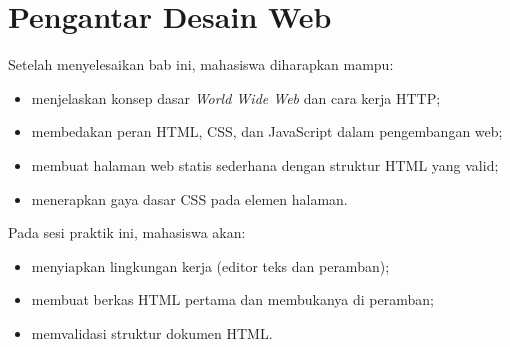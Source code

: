 %

\chapter{Pengantar Desain Web}
\label{chap:pengantar}

\begin{capaian}
Setelah menyelesaikan bab ini, mahasiswa diharapkan mampu:
\begin{itemize}
  \item menjelaskan konsep dasar \emph{World Wide Web} dan cara kerja HTTP;
  \item membedakan peran HTML, CSS, dan JavaScript dalam pengembangan web;
  \item membuat halaman web statis sederhana dengan struktur HTML yang valid;
  \item menerapkan gaya dasar CSS pada elemen halaman.
\end{itemize}
\end{capaian}

\begin{tujuanpraktik}
Pada sesi praktik ini, mahasiswa akan:
\begin{itemize}
  \item menyiapkan lingkungan kerja (editor teks dan peramban);
  \item membuat berkas HTML pertama dan membukanya di peramban;
  \item memvalidasi struktur dokumen HTML.
\end{itemize}
\end{tujuanpraktik}

